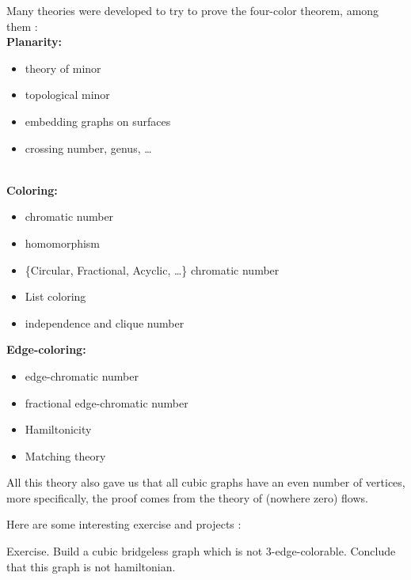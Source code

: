 \documentclass[12pt,a4paper]{article} \usepackage{fontspec}
\begin{document}

Many theories were developed to try to prove the four-color theorem, among them
:\\

\textbf{Planarity:} \begin{itemize}[noitemsep,nolistsep] \item theory of minor
\item topological minor \item embedding graphs on surfaces \item crossing
number, genus, … \end{itemize} \vspace{0.3 cm} \\

\textbf{Coloring:} \begin{itemize}[noitemsep,nolistsep] \item chromatic number
\item homomorphism \item \{Circular, Fractional, Acyclic, …\} chromatic number
\item List coloring \item independence and clique number \end{itemize}
\vspace{0.3 cm}

\textbf{Edge-coloring:} \begin{itemize}[noitemsep,nolistsep] \item
edge-chromatic number \item fractional edge-chromatic number \item Hamiltonicity
\item Matching theory \end{itemize} \vspace{0.3 cm}

All this theory also gave us that all cubic graphs have an even number of
vertices, more specifically, the proof comes from the theory of (nowhere zero)
flows.

Here are some interesting exercise and projects :

Exercise. Build a cubic bridgeless graph which is not 3-edge-colorable. Conclude
that this graph is not hamiltonian.
\end{document}
